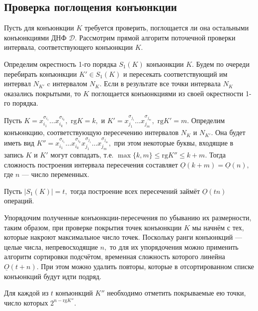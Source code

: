 \documentclass[12pt,a4paper,oneside,fleqn,leqno]{article}
\theoremstyle{definition}
\begin{document}
		\subsection{Проверка поглощения конъюнкции}
			Пусть для конъюнкции $K$ требуется проверить, поглощается ли она остальными конъюнкциями ДНФ $\mathcal{D}.$ Рассмотрим прямой алгоритм поточечной проверки интервала, соответствующего конъюнкции $K.$\par
			Определим окрестность 1-го порядка $S_1(K)$ конъюнкции $K.$ Будем по очереди перебирать конъюнкции $K' \in S_1(K)$ и пересекать соответствующий им интервал $N_{K'}$ c интервалом $N_K.$ Если в результате все точки интервала $N_K$ оказались покрытыми, то $K$ поглощается конъюнкциями из своей окрестности 1-го порядка.\par
			Пусть $K = x_{i_1}^{\sigma_{i_1}} \ldots x_{i_k}^{\sigma_{i_k}},\,\, \text{rg}K = k,$ и $K' = x_{j_1}^{\sigma_{j_1}} \ldots x_{j_m}^{\sigma_{j_m}},\,\, \text{rg}K' = m.$ Определим конъюнкцию, соответствующую пересечению интервалов $N_K$ и $N_{K'}.$ Она будет иметь вид $K'' = x_{i_1}^{\sigma_{i_1}} \ldots x_{i_k}^{\sigma_{i_k}} x_{j_1}^{\sigma_{j_1}} \ldots x_{j_m}^{\sigma_{j_m}},$ при этом некоторые буквы, входящие в запись $K$ и $K'$ могут совпадать, т.е. $\max\{k, m\} \leqslant \text{rg}K'' \leqslant k + m.$ Тогда сложность построения интервала пересечения составляет $\underline{O}(k + m) = \underline{O}(n),$ где $n$ --- число переменных.\par
			Пусть $|S_1(K)| = t,$ тогда построение всех пересечений займёт $\underline{O}(tn)$ операций.\par
			Упорядочим полученные конъюнкции-пересечения по убыванию их размерности, таким образом, при проверке покрытия точек конъюнкции $K$ мы начнём с тех, которые накроют максимальное число точек. Поскольку ранги конъюнкций --- целые числа, непревосходящие $n,$ то для их упорядочения можно применить алгоритм сортировки подсчётом, временная сложность которого линейна $\underline{O}(t + n).$ При этом можно удалить повторы, которые в отсортированном списке конъюнкций будут идти подряд.\par
			Для каждой из $t$ конъюнкций $K''$ необходимо отметить покрываемые ею точки, число которых $2^{n - \text{rg}K''}.$\par
\end{document}
